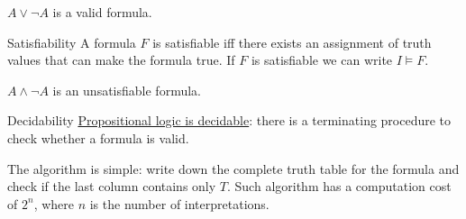 \documentclass{article}
\begin{document}
\begin{example}
   $A\lor\neg A$ is a valid formula.
\end{example}
\begin{Definition}{Satisfiability}{}
    A formula $F$ is satisfiable iff there exists an assignment of truth
    values that can make the formula true. If $F$ is satisfiable we can write
    $I\models F$.
\end{Definition}
\begin{example}
   $A\land\neg A$ is an unsatisfiable formula. 
\end{example}
\begin{Definition}{Decidability}{}
    \underline{Propositional logic is decidable}: there is a terminating
    procedure to check whether a formula is valid.

    The algorithm is simple: write down the complete truth table for the
    formula and check if the last column contains only $T$. Such algorithm has
    a computation cost of $2^n$, where $n$ is the number of interpretations.
\end{Definition}
\end{document}
